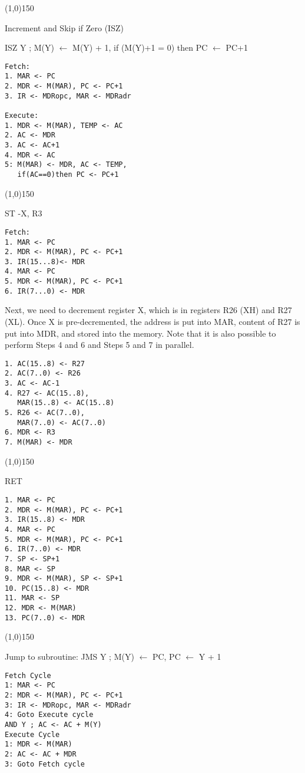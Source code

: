 \documentclass[8pt]{article}
\begin{document}
\begin{multicols}{3}
\line(1,0){150}

Increment and Skip if Zero (ISZ)

ISZ Y ; M(Y) $\leftarrow$ M(Y) + 1, if (M(Y)+1 = 0) then PC $\leftarrow$ PC+1

\begin{verbatim}
Fetch: 
1. MAR <- PC
2. MDR <- M(MAR), PC <- PC+1
3. IR <- MDRopc, MAR <- MDRadr

Execute: 
1. MDR <- M(MAR), TEMP <- AC
2. AC <- MDR
3. AC <- AC+1
4. MDR <- AC
5: M(MAR) <- MDR, AC <- TEMP, 
   if(AC==0)then PC <- PC+1

\end{verbatim}

\line(1,0){150}

ST -X, R3

\begin{verbatim}
Fetch: 
1. MAR <- PC
2. MDR <- M(MAR), PC <- PC+1
3. IR(15...8)<- MDR
4. MAR <- PC
5. MDR <- M(MAR), PC <- PC+1
6. IR(7...0) <- MDR
\end{verbatim}

Next, we need to decrement register X, which is in registers R26 (XH) and R27
(XL). Once X is pre-decremented, the address is put into MAR, content of R27
is put into MDR, and stored into the memory. Note that it is also possible to
perform Steps 4 and 6 and Steps 5 and 7 in parallel. 

\begin{verbatim}
1. AC(15..8) <- R27
2. AC(7..0) <- R26
3. AC <- AC-1
4. R27 <- AC(15..8), 
   MAR(15..8) <- AC(15..8)
5. R26 <- AC(7..0), 
   MAR(7..0) <- AC(7..0)
6. MDR <- R3
7. M(MAR) <- MDR
\end{verbatim}

\line(1,0){150}

RET

\begin{verbatim}
1. MAR <- PC
2. MDR <- M(MAR), PC <- PC+1
3. IR(15..8) <- MDR
4. MAR <- PC
5. MDR <- M(MAR), PC <- PC+1
6. IR(7..0) <- MDR
7. SP <- SP+1
8. MAR <- SP
9. MDR <- M(MAR), SP <- SP+1
10. PC(15..8) <- MDR
11. MAR <- SP
12. MDR <- M(MAR)
13. PC(7..0) <- MDR
\end{verbatim}

\line(1,0){150}

Jump to subroutine: JMS Y ; M(Y) $\leftarrow$ PC, PC $\leftarrow$ Y + 1

\begin{verbatim}
Fetch Cycle
1: MAR <- PC
2: MDR <- M(MAR), PC <- PC+1
3: IR <- MDRopc, MAR <- MDRadr
4: Goto Execute cycle
AND Y ; AC <- AC + M(Y)
Execute Cycle
1: MDR <- M(MAR)
2: AC <- AC + MDR
3: Goto Fetch cycle
\end{verbatim}



\end{multicols}
\end{document}
